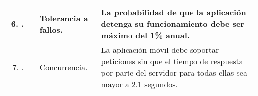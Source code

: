 \begin{longtable}{|M{1.6cm}|M{4.0cm}|M{6.0cm}|}
    \begin{enumerate}[label=RNF\arabic*]
        \setcounter{enumi}{5}
 	    \item.
 	\end{enumerate}
 	& Tolerancia a fallos.
 	& La probabilidad de que la aplicación detenga su funcionamiento debe ser máximo del 1\% anual.  \\
    \hline
    \begin{enumerate}[label=RNF\arabic*]
        \setcounter{enumi}{6}
 	    \item.
 	\end{enumerate}
 	& Concurrencia.
 	& La aplicación móvil debe soportar peticiones sin que el tiempo de respuesta por parte del servidor para todas ellas sea mayor a 2.1 segundos. \\
    \hline
\end{longtable}
